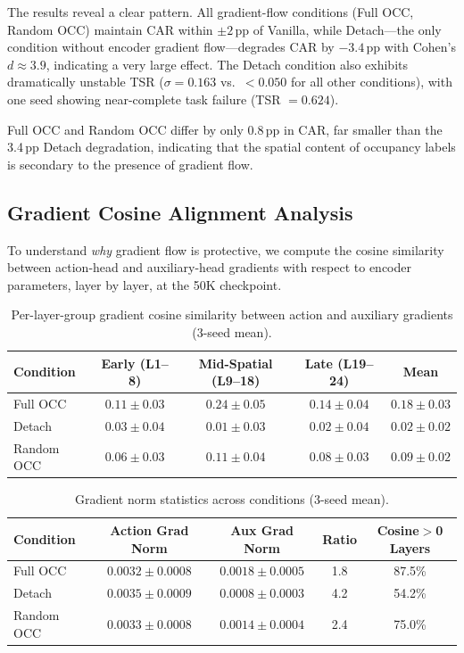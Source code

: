 \documentclass[letterpaper]{article}
\begin{document}
The results reveal a clear pattern. All gradient-flow conditions (Full OCC, Random OCC) maintain CAR within $\pm 2$\,pp of Vanilla, while Detach---the only condition without encoder gradient flow---degrades CAR by $-3.4$\,pp with Cohen's $d \approx 3.9$, indicating a very large effect. The Detach condition also exhibits dramatically unstable TSR ($\sigma = 0.163$ vs.\ $< 0.050$ for all other conditions), with one seed showing near-complete task failure (TSR $= 0.624$).

Full OCC and Random OCC differ by only 0.8\,pp in CAR, far smaller than the 3.4\,pp Detach degradation, indicating that the spatial content of occupancy labels is secondary to the presence of gradient flow.

\subsection{Gradient Cosine Alignment Analysis}
\label{sec:exp-gradient}

To understand \emph{why} gradient flow is protective, we compute the cosine similarity between action-head and auxiliary-head gradients with respect to encoder parameters, layer by layer, at the 50K checkpoint.

\begin{table}[h]
\centering
\caption{Per-layer-group gradient cosine similarity between action and auxiliary gradients (3-seed mean).}
\label{tab:grad-cosine}
\begin{tabular}{lcccc}
\toprule
Condition & Early (L1--8) & Mid-Spatial (L9--18) & Late (L19--24) & Mean \\
\midrule
Full OCC   & $0.11 \pm 0.03$ & $\mathbf{0.24} \pm 0.05$ & $0.14 \pm 0.04$ & $0.18 \pm 0.03$ \\
Detach     & $0.03 \pm 0.04$ & $0.01 \pm 0.03$          & $0.02 \pm 0.04$ & $0.02 \pm 0.02$ \\
Random OCC & $0.06 \pm 0.03$ & $0.11 \pm 0.04$          & $0.08 \pm 0.03$ & $0.09 \pm 0.02$ \\
\bottomrule
\end{tabular}
\end{table}

\begin{table}[h]
\centering
\caption{Gradient norm statistics across conditions (3-seed mean).}
\label{tab:grad-norm}
\begin{tabular}{lcccc}
\toprule
Condition & Action Grad Norm & Aux Grad Norm & Ratio & Cosine$>$0 Layers \\
\midrule
Full OCC   & $0.0032 \pm 0.0008$ & $0.0018 \pm 0.0005$ & 1.8 & 87.5\% \\
Detach     & $0.0035 \pm 0.0009$ & $0.0008 \pm 0.0003$ & 4.2 & 54.2\% \\
Random OCC & $0.0033 \pm 0.0008$ & $0.0014 \pm 0.0004$ & 2.4 & 75.0\% \\
\bottomrule
\end{tabular}
\end{table}
\end{document}

